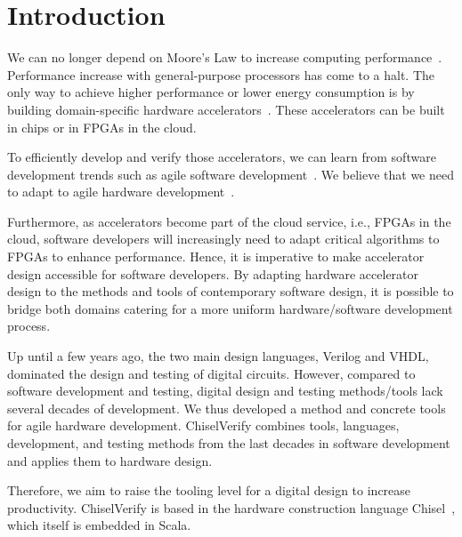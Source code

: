 \documentclass[conference]{IEEEtran}
\begin{document}
\section{Introduction}
\label{sec:introduction}

We can no longer depend on Moore's Law to increase computing performance~\cite{dark-silicon:2011}.
Performance increase with general-purpose processors has come to a halt.
The only way to achieve higher performance or lower energy consumption
is by building domain-specific hardware accelerators~\cite{domain-hw-acc:2020}.
These accelerators can be built in chips or in FPGAs in the cloud.

To efficiently develop and verify those accelerators, we can learn from software development trends such as agile software development~\cite{agile:manifesto}.
We believe that we need to adapt to agile hardware development~\cite{henn-patt:turing:2019}.

Furthermore, as accelerators become part of the cloud service, i.e., FPGAs in the cloud,
software developers will increasingly need to adapt critical algorithms to FPGAs to enhance performance.
Hence, it is imperative to make accelerator design accessible for software developers.
By adapting hardware accelerator design to the methods and tools of contemporary software design,
it is possible to bridge both domains catering for a more uniform hardware/software development process.

Up until a few years ago, the two main design languages, Verilog and VHDL, dominated the
design and testing of digital circuits.
However, compared to software development and testing, digital design and testing methods/tools 
lack several decades of development.
We thus developed a method and concrete tools for agile hardware development.
ChiselVerify combines tools, languages, development, and testing methods from the last decades in
software development and applies them to hardware design.

Therefore, we aim to raise the tooling level for a digital design to increase productivity.
ChiselVerify is based in the hardware construction language Chisel~\cite{chisel:dac2012},
which itself is embedded in Scala.


\end{document}
